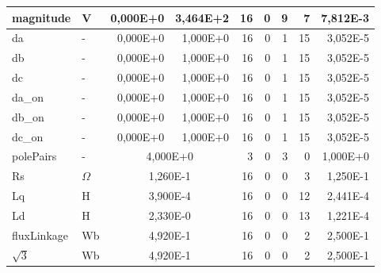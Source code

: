 \begin{table}[!ht]
\begin{tabular}{|l|l|r|r|r|r|r|r|r|}
        magnitude & V & 0,000E+0 & 3,464E+2 & 16 & 0 & 9 & 7 & 7,812E-3 \\ \hline
        da & - & 0,000E+0 & 1,000E+0 & 16 & 0 & 1 & 15 & 3,052E-5 \\ \hline
        db & - & 0,000E+0 & 1,000E+0 & 16 & 0 & 1 & 15 & 3,052E-5 \\ \hline
        dc & - & 0,000E+0 & 1,000E+0 & 16 & 0 & 1 & 15 & 3,052E-5 \\ \hline
        da\_on & - & 0,000E+0 & 1,000E+0 & 16 & 0 & 1 & 15 & 3,052E-5 \\ \hline
        db\_on & - & 0,000E+0 & 1,000E+0 & 16 & 0 & 1 & 15 & 3,052E-5 \\ \hline
        dc\_on & - & 0,000E+0 & 1,000E+0 & 16 & 0 & 1 & 15 & 3,052E-5 \\ \hline
        polePairs &	- & \multicolumn{2}{|c|}{4,000E+0} & 3 & 0 & 3 & 0 & 1,000E+0 \\ \hline
        Rs & $\Omega$ & \multicolumn{2}{|c|}{1,260E-1} & 16 & 0 & 0 & 3 & 1,250E-1 \\ \hline
        Lq & H & \multicolumn{2}{|c|}{3,900E-4} & 16 & 0 & 0 & 12 & 2,441E-4 \\ \hline
        Ld & H & \multicolumn{2}{|c|}{2,330E-0} & 16 & 0 & 0 & 13 & 1,221E-4 \\ \hline
        fluxLinkage & Wb & \multicolumn{2}{|c|}{4,920E-1} & 16 & 0 & 0 & 2 & 2,500E-1 \\ \hline
        $\sqrt{3}$ & Wb & \multicolumn{2}{|c|}{4,920E-1} & 16 & 0 & 0 & 2 & 2,500E-1 \\ \hline
    \end{tabular}
\end{table}